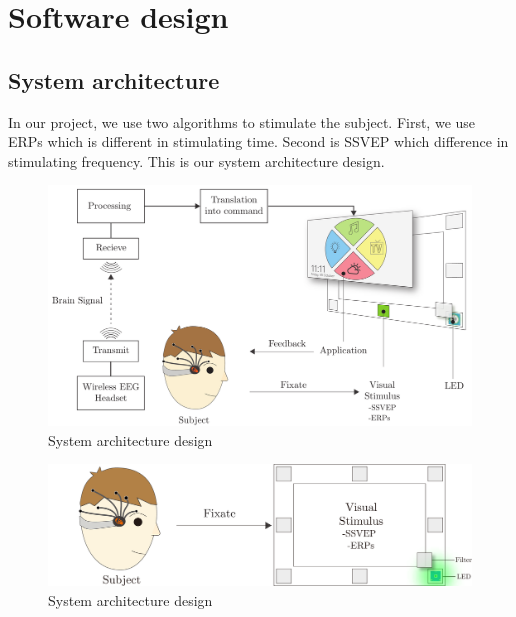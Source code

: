\chapter{Software design}

\label{ch:Software design}

\setlength{\parindent}{4em}
\setlength{\parskip}{1em}
\renewcommand{\baselinestretch}{1.5}

\section{System architecture}

\hspace{1.5cm}In our project, we use two algorithms to stimulate the subject. First, we use ERPs which is different in stimulating time. Second is SSVEP which difference in stimulating frequency. This is our system architecture design.

\begin{figure}[ht]
	\centering
	\includegraphics[scale = 0.28]{chapter5/architec.pdf}
	\caption{System architecture design}
\end{figure}

\begin{figure}[ht]
	\centering
	\includegraphics[scale = 0.33]{chapter5/frame_led.pdf}
	\caption{System architecture design}
\end{figure}

